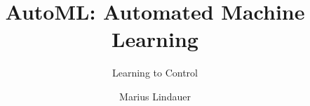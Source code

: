 




\title[AutoML: Learning to Control]{AutoML: Automated Machine Learning}
\subtitle{Learning to Control}
\author{Marius Lindauer}
\date{}





	
	\maketitle
	

